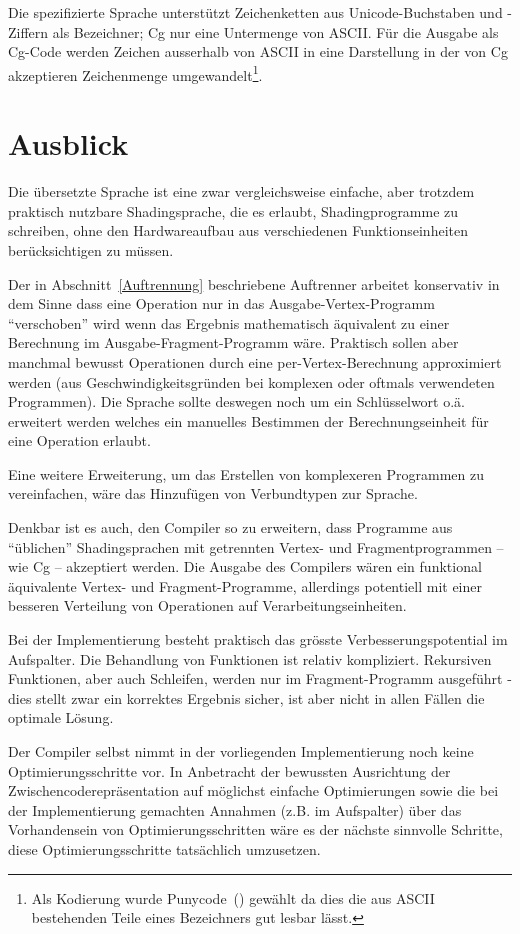 \documentclass[twoside,a4paper,fleqn,12pt]{book}
\begin{document}
Die spezifizierte Sprache unterstützt Zeichenketten aus Unicode-Buchstaben und -Ziffern als Bezeichner;
Cg nur eine Untermenge von ASCII. Für die Ausgabe als Cg-Code werden Zeichen ausserhalb von ASCII in eine Darstellung in der von Cg akzeptieren
Zeichenmenge umgewandelt\footnote{Als Kodierung wurde Punycode~(\cite{rfc3492}) gewählt da dies die aus ASCII bestehenden Teile eines Bezeichners
gut lesbar lässt.}.


\chapter{Ausblick}


Die übersetzte Sprache ist eine zwar vergleichsweise einfache, aber trotzdem praktisch nutzbare
Shadingsprache, die es erlaubt, Shadingprogramme zu schreiben, ohne den Hardwareaufbau aus verschiedenen Funktionseinheiten
berücksichtigen zu müssen.

Der in Abschnitt~\ref{Auftrennung} beschriebene Auftrenner arbeitet konservativ in dem Sinne dass eine Operation nur in das Ausgabe-Vertex-Programm
"`verschoben"' wird wenn das Ergebnis mathematisch äquivalent zu einer Berechnung im Ausgabe-Fragment-Programm wäre.
Praktisch sollen aber manchmal bewusst Operationen durch eine per-Vertex-Berechnung approximiert werden (aus Geschwindigkeitsgründen
bei komplexen oder oftmals verwendeten Programmen). Die Sprache sollte deswegen noch um ein Schlüsselwort o.ä. erweitert werden
welches ein manuelles Bestimmen der Berechnungseinheit für eine Operation erlaubt.

Eine weitere Erweiterung, um das Erstellen von komplexeren Programmen zu vereinfachen, wäre das Hinzufügen von Verbundtypen zur Sprache.

Denkbar ist es auch, den Compiler so zu erweitern, dass Programme aus "`üblichen"' Shadingsprachen mit getrennten Vertex- und Fragmentprogrammen
-- wie Cg -- akzeptiert werden. Die Ausgabe des Compilers wären ein funktional äquivalente Vertex- und Fragment-Programme,
allerdings potentiell mit einer besseren Verteilung von Operationen auf Verarbeitungseinheiten.

Bei der Implementierung besteht praktisch das grösste Verbesserungspotential im Aufspalter. Die Behandlung von Funktionen ist relativ
kompliziert. Rekursiven Funktionen, aber auch Schleifen, werden nur im Fragment-Programm ausgeführt - dies stellt zwar ein korrektes
Ergebnis sicher, ist aber nicht in allen Fällen die optimale Lösung.

Der Compiler selbst nimmt in der vorliegenden Implementierung noch keine Optimierungsschritte vor. In Anbetracht der bewussten Ausrichtung
der Zwischencoderepräsentation auf möglichst einfache Optimierungen sowie die bei der Implementierung gemachten Annahmen (z.B. im Aufspalter) über das
Vorhandensein von Optimierungsschritten wäre es der nächste sinnvolle Schritte, diese Optimierungsschritte tatsächlich umzusetzen.

\cleardoublepage
\appendix

\end{document}

